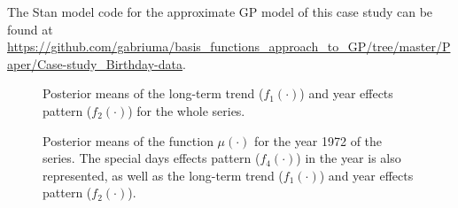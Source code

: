 \documentclass[onecolumn,a4paper,11pt]{article}
\begin{document}
The Stan model code for the approximate GP model of this case study can be found at \small \url{https://github.com/gabriuma/basis_functions_approach_to_GP/tree/master/Paper/Case-study_Birthday-data}.

\begin{figure}
\centering
{}
\caption{Posterior means of the long-term trend ($f_1(\cdot)$) and year effects pattern ($f_2(\cdot)$) for the whole series. }
  \label{ch5_fig27_posteriors_birthday}
\end{figure}

\begin{figure}
\centering
{}
\caption{Posterior means of the function $\mu(\cdot)$ for the year 1972 of the series. The special days effects pattern ($f_4(\cdot)$) in the year is also represented, as well as the long-term trend ($f_1(\cdot)$) and year effects pattern ($f_2(\cdot)$). }
  \label{ch5_fig27_posteriors_oneyear_birthday}
\end{figure}
\end{document}
